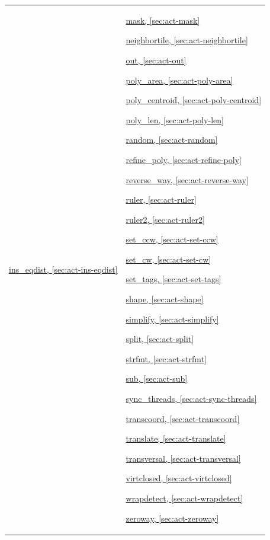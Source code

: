 \begin{tabular}{p{}p{}}
\hyperref[sec:act-ins-eqdist]{ins\_eqdist, \ref*{sec:act-ins-eqdist}}

&
\hyperref[sec:act-mask]{mask, \ref*{sec:act-mask}}

\hyperref[sec:act-neighbortile]{neighbortile, \ref*{sec:act-neighbortile}}

\hyperref[sec:act-out]{out, \ref*{sec:act-out}}

\hyperref[sec:act-poly-area]{poly\_area, \ref*{sec:act-poly-area}}

\hyperref[sec:act-poly-centroid]{poly\_centroid, \ref*{sec:act-poly-centroid}}

\hyperref[sec:act-poly-len]{poly\_len, \ref*{sec:act-poly-len}}

\hyperref[sec:act-random]{random, \ref*{sec:act-random}}

\hyperref[sec:act-refine-poly]{refine\_poly, \ref*{sec:act-refine-poly}}

\hyperref[sec:act-reverse-way]{reverse\_way, \ref*{sec:act-reverse-way}}

\hyperref[sec:act-ruler]{ruler, \ref*{sec:act-ruler}}

\hyperref[sec:act-ruler2]{ruler2, \ref*{sec:act-ruler2}}

\hyperref[sec:act-set-ccw]{set\_ccw, \ref*{sec:act-set-ccw}}

\hyperref[sec:act-set-cw]{set\_cw, \ref*{sec:act-set-cw}}

\hyperref[sec:act-set-tags]{set\_tags, \ref*{sec:act-set-tags}}

\hyperref[sec:act-shape]{shape, \ref*{sec:act-shape}}

\hyperref[sec:act-simplify]{simplify, \ref*{sec:act-simplify}}

\hyperref[sec:act-split]{split, \ref*{sec:act-split}}

\hyperref[sec:act-strfmt]{strfmt, \ref*{sec:act-strfmt}}

\hyperref[sec:act-sub]{sub, \ref*{sec:act-sub}}

\hyperref[sec:act-sync-threads]{sync\_threads, \ref*{sec:act-sync-threads}}

\hyperref[sec:act-transcoord]{transcoord, \ref*{sec:act-transcoord}}

\hyperref[sec:act-translate]{translate, \ref*{sec:act-translate}}

\hyperref[sec:act-transversal]{transversal, \ref*{sec:act-transversal}}

\hyperref[sec:act-virtclosed]{virtclosed, \ref*{sec:act-virtclosed}}

\hyperref[sec:act-wrapdetect]{wrapdetect, \ref*{sec:act-wrapdetect}}

\hyperref[sec:act-zeroway]{zeroway, \ref*{sec:act-zeroway}}

\end{tabular}
